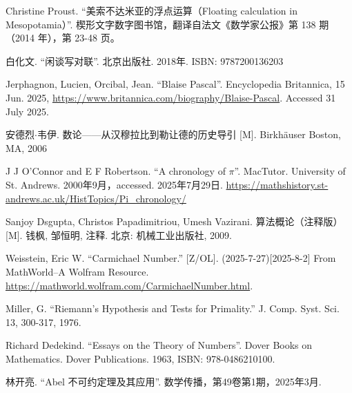 Christine Proust. ``美索不达米亚的浮点运算（Floating calculation in Mesopotamia）''. 楔形文字数字图书馆，翻译自法文《数学家公报》第 138 期（2014 年），第 23-48 页。


白化文. ``闲谈写对联''. 北京出版社. 2018年. ISBN: 9787200136203

Jerphagnon, Lucien, Orcibal, Jean. ``Blaise Pascal''. Encyclopedia Britannica, 15 Jun. 2025, \url{https://www.britannica.com/biography/Blaise-Pascal}. Accessed 31 July 2025.

安德烈$\cdot$韦伊. 数论——从汉穆拉比到勒让德的历史导引 [M]. Birkhäuser Boston, MA, 2006 %

J J O'Connor and E F Robertson. ``A chronology of $\pi$''. MacTutor. University of St. Andrews. 2000年9月，accessed. 2025年7月29日. \url{https://mathshistory.st-andrews.ac.uk/HistTopics/Pi_chronology/}

Sanjoy Dsgupta, Christos Papadimitriou, Umesh Vazirani. 算法概论（注释版） [M]. 钱枫, 邹恒明, 注释. 北京: 机械工业出版社, 2009. %

Weisstein, Eric W. ``Carmichael Number.'' [Z/OL]. (2025-7-27)[2025-8-2] From MathWorld--A Wolfram Resource. \url{https://mathworld.wolfram.com/CarmichaelNumber.html}.

Miller, G. ``Riemann's Hypothesis and Tests for Primality.'' J. Comp. Syst. Sci. 13, 300-317, 1976.

Richard Dedekind. ``Essays on the Theory of Numbers''. Dover Books on Mathematics. Dover Publications. 1963, ISBN: 978-0486210100.

林开亮. ``Abel 不可约定理及其应用''. 数学传播，第49卷第1期，2025年3月.
